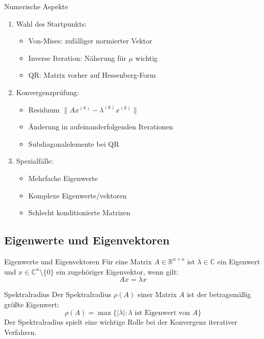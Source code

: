 \begin{KR}{Numerische Aspekte}
\begin{enumerate}
    \item Wahl des Startpunkts:
    \begin{itemize}
        \item Von-Mises: zufälliger normierter Vektor
        \item Inverse Iteration: Näherung für $\mu$ wichtig
        \item QR: Matrix vorher auf Hessenberg-Form
    \end{itemize}
    
    \item Konvergenzprüfung:
    \begin{itemize}
        \item Residuum $\|Ax^{(k)} - \lambda^{(k)}x^{(k)}\|$
        \item Änderung in aufeinanderfolgenden Iterationen
        \item Subdiagonalelemente bei QR
    \end{itemize}
    
    \item Spezialfälle:
    \begin{itemize}
        \item Mehrfache Eigenwerte
        \item Komplexe Eigenwerte/vektoren
        \item Schlecht konditionierte Matrizen
    \end{itemize}
\end{enumerate}
\end{KR}


\subsection{Eigenwerte und Eigenvektoren}

\begin{definition}{Eigenwerte und Eigenvektoren}
Für eine Matrix $A \in \mathbb{R}^{n \times n}$ ist $\lambda \in \mathbb{C}$ ein Eigenwert und $x \in \mathbb{C}^n \setminus \{0\}$ ein zugehöriger Eigenvektor, wenn gilt:
$$Ax = \lambda x$$
\end{definition}

\begin{concept}{Spektralradius}
Der Spektralradius $\rho(A)$ einer Matrix $A$ ist der betragsmäßig größte Eigenwert:
$$\rho(A) = \max\{|\lambda| : \lambda \text{ ist Eigenwert von } A\}$$
Der Spektralradius spielt eine wichtige Rolle bei der Konvergenz iterativer Verfahren.
\end{concept}

